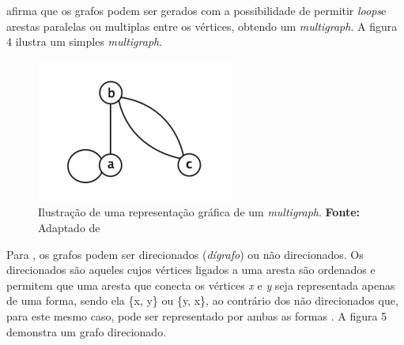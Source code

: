 \par {} afirma que os grafos podem ser gerados com a possibilidade de permitir \textit{loops}\footnotemark[4] e arestas paralelas ou multiplas entre os vértices, obtendo um \textit{multigraph}. A figura 4 ilustra um simples \textit{multigraph}.


\begin{figure}[h!]
	\centerline{\includegraphics[scale=0.9]{./imagens/multigraph_example.png}}
	\caption[Ilustração de uma representação gráfica de um \textit{multigraph}]
	{Ilustração de uma representação gráfica de um \textit{multigraph}. \textbf{Fonte:} Adaptado de }
	\label{fig:exemplo1}
\end{figure}

\par Para , os grafos podem ser direcionados (\textit{dígrafo}) ou não direcionados. Os  direcionados são aqueles cujos vértices ligados a uma aresta são ordenados e permitem que uma aresta que conecta os vértices \textit{x} e \textit{y} seja representada apenas de uma forma, sendo ela \{x, y\} ou \{y, x\}, ao contrário dos não direcionados que, para este mesmo caso, pode ser representado por ambas as formas . A figura 5 demonstra um grafo direcionado.

